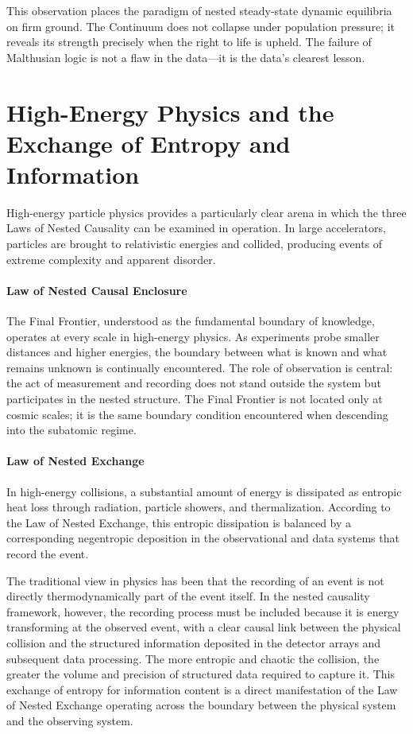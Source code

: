 This observation places the paradigm of nested steady-state dynamic equilibria on firm ground. The Continuum does not collapse under population pressure; it reveals its strength precisely when the right to life is upheld. The failure of Malthusian logic is not a flaw in the data—it is the data’s clearest lesson.

\chapter{High-Energy Physics and the Exchange of Entropy and Information}

High-energy particle physics provides a particularly clear arena in which the three Laws of Nested Causality can be examined in operation. In large accelerators, particles are brought to relativistic energies and collided, producing events of extreme complexity and apparent disorder.

\subsubsection{Law of Nested Causal Enclosure}

The Final Frontier, understood as the fundamental boundary of knowledge, operates at every scale in high-energy physics. As experiments probe smaller distances and higher energies, the boundary between what is known and what remains unknown is continually encountered. The role of observation is central: the act of measurement and recording does not stand outside the system but participates in the nested structure. The Final Frontier is not located only at cosmic scales; it is the same boundary condition encountered when descending into the subatomic regime.

\subsubsection{Law of Nested Exchange}

In high-energy collisions, a substantial amount of energy is dissipated as entropic heat loss through radiation, particle showers, and thermalization. According to the Law of Nested Exchange, this entropic dissipation is balanced by a corresponding negentropic deposition in the observational and data systems that record the event.

The traditional view in physics has been that the recording of an event is not directly thermodynamically part of the event itself. In the nested causality framework, however, the recording process must be included because it is energy transforming at the observed event, with a clear causal link between the physical collision and the structured information deposited in the detector arrays and subsequent data processing. The more entropic and chaotic the collision, the greater the volume and precision of structured data required to capture it. This exchange of entropy for information content is a direct manifestation of the Law of Nested Exchange operating across the boundary between the physical system and the observing system.

